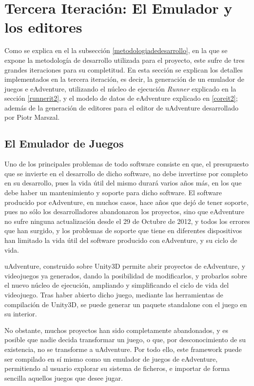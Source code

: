 \chapter{Tercera Iteración: El Emulador y los editores}

Como se explica en el la subsección \ref{metodologiadedesarrollo}, en la que se expone la metodología de desarrollo utilizada para el proyecto, este sufre de tres grandes iteraciones para su completitud. En esta sección se explican los detalles implementados en la tercera iteración, es decir, la generación de un emulador de juegos e eAdventure, utilizando el núcleo de ejecución \textit{Runner} explicado en la sección \ref{runnerit2}, y el modelo de datos de eAdventure explicado en \ref{coreit2}; además de la generación de editores para el editor de uAdventure desarrollado por Piotr Marszal. 

\section{El Emulador de Juegos}
\label{emulatorit3}

Uno de los principales problemas de todo software consiste en que, el presupuesto que se invierte en el desarrollo de dicho software, no debe invertirse por completo en su desarrollo, pues la vida útil del mismo durará varios años más, en los que debe haber un mantenimiento y soporte para dicho software. El software producido por eAdventure, en muchos casos, hace años que dejó de tener soporte, pues no sólo los desarrolladores abandonaron los proyectos, sino que eAdventure no sufre ninguna actualización desde el 29 de Octubre de 2012, y todos los errores que han surgido, y los problemas de soporte que tiene en diferentes dispositivos han limitado la vida útil del software producido con eAdventure, y su ciclo de vida.

uAdventure, construido sobre Unity3D permite abrir proyectos de eAdventure, y videojuegos ya generados, dando la posibilidad de modificarlos, y probarlos sobre el nuevo núcleo de ejecución, ampliando y simplificando el ciclo de vida del videojuego. Tras haber abierto dicho juego, mediante las herramientas de compilación de Unity3D, se puede generar un paquete standalone con el juego en su interior.

No obstante, muchos proyectos han sido completamente abandonados, y es posible que nadie decida transformar un juego, o que, por desconocimiento de su existencia, no se transforme a uAdventure. Por todo ello, este framework puede ser compilado en sí mismo como un emulador de juegos de eAdventure, permitiendo al usuario explorar su sistema de ficheros, e importar de forma sencilla aquellos juegos que desee jugar.

